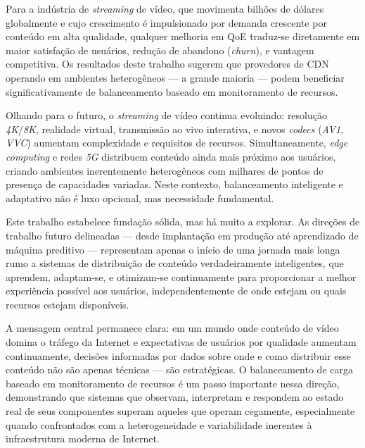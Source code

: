 Para a indústria de \textit{streaming} de vídeo, que movimenta bilhões de dólares globalmente e cujo crescimento é impulsionado por demanda crescente por conteúdo em alta qualidade, qualquer melhoria em QoE traduz-se diretamente em maior satisfação de usuários, redução de abandono (\textit{churn}), e vantagem competitiva. Os resultados deste trabalho sugerem que provedores de CDN operando em ambientes heterogêneos — a grande maioria — podem beneficiar significativamente de balanceamento baseado em monitoramento de recursos.

Olhando para o futuro, o \textit{streaming} de vídeo continua evoluindo: resolução \textit{4K}/\textit{8K}, realidade virtual, transmissão ao vivo interativa, e novos \textit{codecs} (\textit{AV1}, \textit{VVC}) aumentam complexidade e requisitos de recursos. Simultaneamente, \textit{edge computing} e redes \textit{5G} distribuem conteúdo ainda mais próximo aos usuários, criando ambientes inerentemente heterogêneos com milhares de pontos de presença de capacidades variadas. Neste contexto, balanceamento inteligente e adaptativo não é luxo opcional, mas necessidade fundamental.

Este trabalho estabelece fundação sólida, mas há muito a explorar. As direções de trabalho futuro delineadas — desde implantação em produção até aprendizado de máquina preditivo — representam apenas o início de uma jornada mais longa rumo a sistemas de distribuição de conteúdo verdadeiramente inteligentes, que aprendem, adaptam-se, e otimizam-se continuamente para proporcionar a melhor experiência possível aos usuários, independentemente de onde estejam ou quais recursos estejam disponíveis.

A mensagem central permanece clara: em um mundo onde conteúdo de vídeo domina o tráfego da Internet e expectativas de usuários por qualidade aumentam continuamente, decisões informadas por dados sobre onde e como distribuir esse conteúdo não são apenas técnicas — são estratégicas. O balanceamento de carga baseado em monitoramento de recursos é um passo importante nessa direção, demonstrando que sistemas que observam, interpretam e respondem ao estado real de seus componentes superam aqueles que operam cegamente, especialmente quando confrontados com a heterogeneidade e variabilidade inerentes à infraestrutura moderna de Internet.
